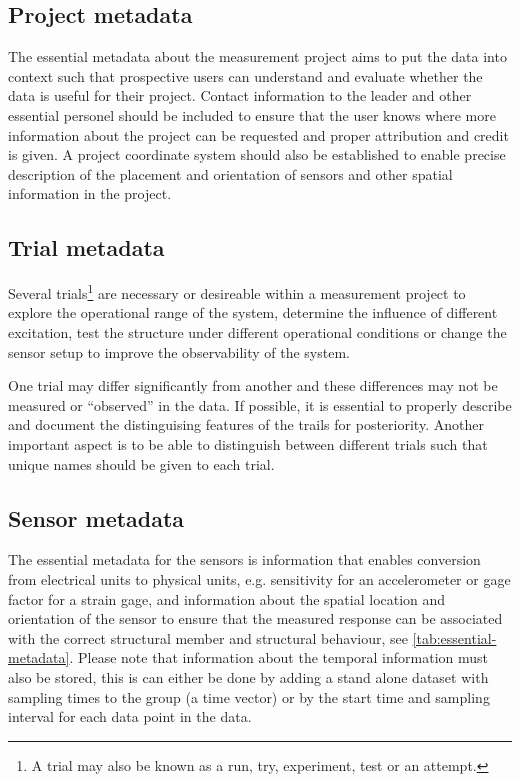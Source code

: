 \documentclass{article}
\begin{document}
\subsection{Project metadata}

The essential metadata about the measurement project aims to put the data into context such that prospective users can understand and evaluate whether the data is useful for their project. Contact information to the leader and other essential personel should be included to ensure that the user knows where more information about the project can be requested and proper attribution and credit is given. A project coordinate system should also be established to enable precise description of the placement and orientation of sensors and other spatial information in the project.


\subsection{Trial metadata}

Several trials\footnote{A trial may also be known as a run, try, experiment, test or an attempt.}  are necessary or desireable within a measurement project to explore the operational range of the system, determine the influence of different excitation, test the structure under different operational conditions or change the sensor setup to improve the observability of the system.

One trial may differ significantly from another and these differences may not be measured or ``observed'' in the data. If possible, it is essential to properly describe and document the distinguising features of the trails for posteriority. Another important aspect is to be able to distinguish between different trials such that unique names should be given to each trial.


\subsection{Sensor metadata}

The essential metadata for the sensors is information that enables conversion from electrical units to physical units, e.g. sensitivity for an accelerometer or gage factor for a strain gage, and information about the spatial location and orientation of the sensor to ensure that the measured response can be associated with the correct structural member and structural behaviour, see \cref{tab:essential-metadata}. Please note that information about the temporal information must also be stored, this is can either be done by adding a stand alone dataset with sampling times to the group (a time vector) or by the start time and sampling interval for each data point in the data. 
\end{document}
